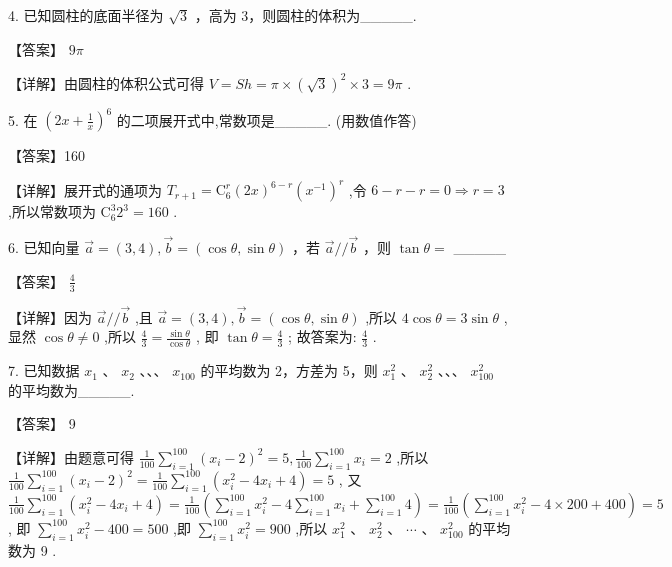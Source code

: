 \documentclass[10pt]{article}
\begin{document}
4. 已知圆柱的底面半径为 \(\sqrt{3}\) ，高为 3，则圆柱的体积为\_\_\_\_\_.

【答案】 \({9\pi }\)

【详解】由圆柱的体积公式可得 \(V = {Sh} = \pi  \times  {\left( \sqrt{3}\right) }^{2} \times  3 = {9\pi }\) .

5. 在 \({\left( 2x + \frac{1}{x}\right) }^{6}\) 的二项展开式中,常数项是\_\_\_\_\_. (用数值作答)

【答案】160

【详解】展开式的通项为 \({T}_{r + 1} = {\mathrm{C}}_{6}^{r}{\left( 2x\right) }^{6 - r}{\left( {x}^{-1}\right) }^{r}\) ,令 \(6 - r - r = 0 \Rightarrow  r = 3\) ,所以常数项为 \({\mathrm{C}}_{6}^{3}{2}^{3} = {160}\) .

6. 已知向量 \(\overrightarrow{a} = \left( {3,4}\right) ,\overrightarrow{b} = \left( {\cos \theta ,\sin \theta }\right)\) ，若 \(\overrightarrow{a}//\overrightarrow{b}\) ，则 \(\tan \theta  =\) \_\_\_\_\_

【答案】 \(\frac{4}{3}\)

【详解】因为 \(\overrightarrow{a}//\overrightarrow{b}\) ,且 \(\overrightarrow{a} = \left( {3,4}\right) ,\overrightarrow{b} = \left( {\cos \theta ,\sin \theta }\right)\) ,所以 \(4\cos \theta  = 3\sin \theta\) ,显然 \(\cos \theta  \neq  0\) ,所以 \(\frac{4}{3} = \frac{\sin \theta }{\cos \theta }\) , 即 \(\tan \theta  = \frac{4}{3}\) ; 故答案为: \(\frac{4}{3}\) .

7. 已知数据 \({x}_{1}\) 、 \({x}_{2}\) 、、、 \({x}_{100}\) 的平均数为 2，方差为 5，则 \({x}_{1}^{2}\) 、 \({x}_{2}^{2}\) 、、、 \({x}_{100}^{2}\) 的平均数为\_\_\_\_\_.

【答案】 9

【详解】由题意可得 \(\frac{1}{100}\mathop{\sum }\limits_{{i = 1}}^{{100}}{\left( {x}_{i} - 2\right) }^{2} = 5,\frac{1}{100}\mathop{\sum }\limits_{{i = 1}}^{{100}}{x}_{i} = 2\) ,所以 \(\frac{1}{100}\mathop{\sum }\limits_{{i = 1}}^{{100}}{\left( {x}_{i} - 2\right) }^{2} = \frac{1}{100}\mathop{\sum }\limits_{{i = 1}}^{{100}}\left( {{x}_{i}^{2} - 4{x}_{i} + 4}\right)  = 5\) , 又 \(\frac{1}{100}\mathop{\sum }\limits_{{i = 1}}^{{100}}\left( {{x}_{i}^{2} - 4{x}_{i} + 4}\right)  = \frac{1}{100}\left( {\mathop{\sum }\limits_{{i = 1}}^{{100}}{x}_{i}^{2} - 4\mathop{\sum }\limits_{{i = 1}}^{{100}}{x}_{i} + \mathop{\sum }\limits_{{i = 1}}^{{100}}4}\right)  = \frac{1}{100}\left( {\mathop{\sum }\limits_{{i = 1}}^{{100}}{x}_{i}^{2} - 4 \times  {200} + {400}}\right)  = 5\) , 即 \(\mathop{\sum }\limits_{{i = 1}}^{{100}}{x}_{i}^{2} - {400} = {500}\) ,即 \(\mathop{\sum }\limits_{{i = 1}}^{{100}}{x}_{i}^{2} = {900}\) ,所以 \({x}_{1}^{2}\text{ 、 }{x}_{2}^{2}\text{ 、 }\cdots \text{ 、 }{x}_{100}^{2}\) 的平均数为 9 .
\end{document}
